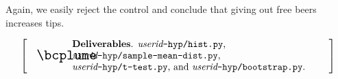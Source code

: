 \documentclass[titlepage]{tufte-book}
\makeatletter
\newenvironment{callout}[1]{
\[
  \left[
      \begin{tabular}{@{\quad}m{.05\textwidth}@{\qquad}m{.75\textwidth}@{\quad}}
        \scalebox{1.5}{#1} & 
          \raggedright%
}
{
      \end{tabular}
    \right]
\]
}
\makeatother
\begin{document}
\begin{fullwidth}
Again, we easily reject the control and conclude that giving out free beers increases tips.

\begin{callout}{\bcplume}
{\bf Deliverables}. {\em userid}{\tt -hyp/hist.py}, {\em userid}{\tt -hyp/sample-mean-dist.py}, {\em userid}{\tt -hyp/t-test.py}, and {\em userid}{\tt -hyp/bootstrap.py}.
\end{callout}

\end{fullwidth}
\end{document}

